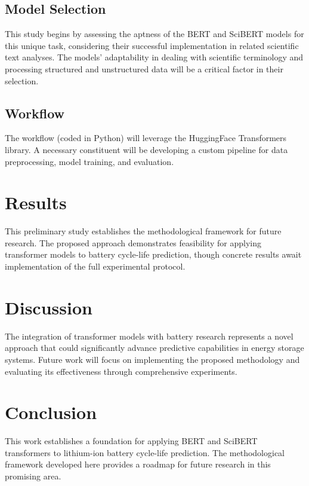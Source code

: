 \documentclass{article}
\begin{document}
\subsection{Model Selection}
This study begins by assessing the aptness of the BERT and SciBERT models for this unique task, considering their successful implementation in related scientific text analyses. The models' adaptability in dealing with scientific terminology and processing structured and unstructured data will be a critical factor in their selection.

\subsection{Workflow}
The workflow (coded in Python) will leverage the HuggingFace Transformers library. A necessary constituent will be developing a custom pipeline for data preprocessing, model training, and evaluation.

\section{Results}

This preliminary study establishes the methodological framework for future research. The proposed approach demonstrates feasibility for applying transformer models to battery cycle-life prediction, though concrete results await implementation of the full experimental protocol.

\section{Discussion}

The integration of transformer models with battery research represents a novel approach that could significantly advance predictive capabilities in energy storage systems. Future work will focus on implementing the proposed methodology and evaluating its effectiveness through comprehensive experiments.

\section{Conclusion}

This work establishes a foundation for applying BERT and SciBERT transformers to lithium-ion battery cycle-life prediction. The methodological framework developed here provides a roadmap for future research in this promising area.
\end{document}
